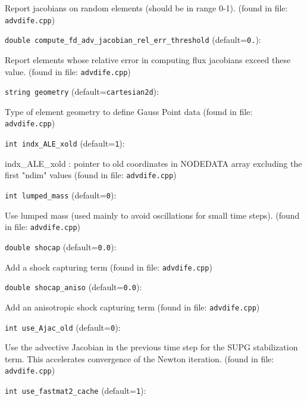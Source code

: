 Report jacobians on random elements (should be in range 0-1).
 (found in file: \verb+advdife.cpp+)
\item\verb+double compute_fd_adv_jacobian_rel_err_threshold+ {\rm(default=\verb|0.|)}:

Report elements whose relative error in computing
 flux jacobians exceed these value.
 (found in file: \verb+advdife.cpp+)
\item\verb+string geometry+ {\rm(default=\verb|cartesian2d|)}:

Type of element geometry to define Gauss Point data
 (found in file: \verb+advdife.cpp+)
\item\verb+int indx_ALE_xold+ {\rm(default=\verb|1|)}:

indx_ALE_xold : pointer to old coordinates in NODEDATA array excluding the first "ndim" values
 (found in file: \verb+advdife.cpp+)
\item\verb+int lumped_mass+ {\rm(default=\verb|0|)}:

Use lumped mass (used mainly to avoid oscillations for small time steps).
 (found in file: \verb+advdife.cpp+)
\item\verb+double shocap+ {\rm(default=\verb|0.0|)}:

Add a shock capturing term
 (found in file: \verb+advdife.cpp+)
\item\verb+double shocap_aniso+ {\rm(default=\verb|0.0|)}:

Add an anisotropic shock capturing term
 (found in file: \verb+advdife.cpp+)
\item\verb+int use_Ajac_old+ {\rm(default=\verb|0|)}:

Use the advective Jacobian in the previous time step
 for the SUPG stabilization term. This accelerates
 convergence of the Newton iteration. 
 (found in file: \verb+advdife.cpp+)
\item\verb+int use_fastmat2_cache+ {\rm(default=\verb|1|)}:

